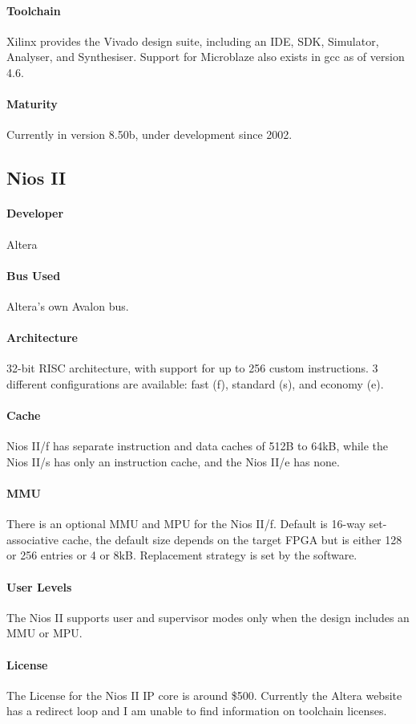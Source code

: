 \paragraph{Toolchain} Xilinx provides the Vivado design suite, including an IDE, SDK, Simulator, Analyser, and Synthesiser. Support for Microblaze also exists in gcc as of version 4.6.
\paragraph{Maturity} Currently in version 8.50b, under development since 2002.

\subsection{Nios II}
\paragraph{Developer} Altera
\paragraph{Bus Used} Altera's own Avalon bus.
\paragraph{Architecture} 32-bit RISC architecture, with support for up to 256 custom instructions. 3 different configurations are available: fast (f), standard (s), and economy (e).
\paragraph{Cache} Nios II/f has separate instruction and data caches of 512B to 64kB, while the Nios II/s has only an instruction cache, and the Nios II/e has none.
\paragraph{MMU} There is an optional MMU and MPU for the Nios II/f. Default is 16-way set-associative cache, the default size depends on the target FPGA but is either 128 or 256 entries or 4 or 8kB. Replacement strategy is set by the software.
\paragraph{User Levels} The Nios II supports user and supervisor modes only when the design includes an MMU or MPU.
\paragraph{License} The License for the Nios II IP core is around \$500. Currently the Altera website has a redirect loop and I am unable to find information on toolchain licenses.
